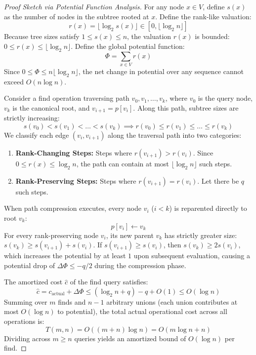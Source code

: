 \documentclass[11pt,a4paper]{article}
\begin{document}
\begin{proof}[Proof Sketch via Potential Function Analysis]
For any node $x \in V$, define $s(x)$ as the number of nodes in the subtree rooted at $x$. Define the rank-like valuation:
\[
r(x) = \lfloor \log_2 s(x) \rfloor \in [0, \lfloor \log_2 n \rfloor]
\]
Because tree sizes satisfy $1 \le s(x) \le n$, the valuation $r(x)$ is bounded: $0 \le r(x) \le \lfloor \log_2 n \rfloor$. Define the global potential function:
\[
\Phi = \sum_{x \in V} r(x)
\]
Since $0 \le \Phi \le n \lfloor \log_2 n \rfloor$, the net change in potential over any sequence cannot exceed $O(n \log n)$.

Consider a find operation traversing path $v_0, v_1, \dots, v_k$, where $v_0$ is the query node, $v_k$ is the canonical root, and $v_{i+1} = p[v_i]$. Along this path, subtree sizes are strictly increasing:
\[
s(v_0) < s(v_1) < \dots < s(v_k) \implies r(v_0) \le r(v_1) \le \dots \le r(v_k)
\]
We classify each edge $(v_i, v_{i+1})$ along the traversal path into two categories:
\begin{enumerate}
    \item \textbf{Rank-Changing Steps:} Steps where $r(v_{i+1}) > r(v_i)$. Since $0 \le r(x) \le \log_2 n$, the path can contain at most $\lfloor \log_2 n \rfloor$ such steps.
    \item \textbf{Rank-Preserving Steps:} Steps where $r(v_{i+1}) = r(v_i)$. Let there be $q$ such steps. 
\end{enumerate}
When path compression executes, every node $v_i$ ($i < k$) is reparented directly to root $v_k$:
\[
p[v_i] \leftarrow v_k
\]
For every rank-preserving node $v_i$, its new parent $v_k$ has strictly greater size: $s(v_k) \ge s(v_{i+1}) + s(v_i)$. If $s(v_{i+1}) \ge s(v_i)$, then $s(v_k) \ge 2 s(v_i)$, which increases the potential by at least $1$ upon subsequent evaluation, causing a potential drop of $\Delta \Phi \le -q/2$ during the compression phase.

The amortized cost $\widehat{c}$ of the find query satisfies:
\[
\widehat{c} = c_{\text{actual}} + \Delta \Phi \le (\log_2 n + q) - q + O(1) \le O(\log n)
\]
Summing over $m$ finds and $n-1$ arbitrary unions (each union contributes at most $O(\log n)$ to potential), the total actual operational cost across all operations is:
\[
T(m, n) = O((m + n) \log n) = O(m \log n + n)
\]
Dividing across $m \ge n$ queries yields an amortized bound of $O(\log n)$ per find.
\end{proof}
\end{document}

